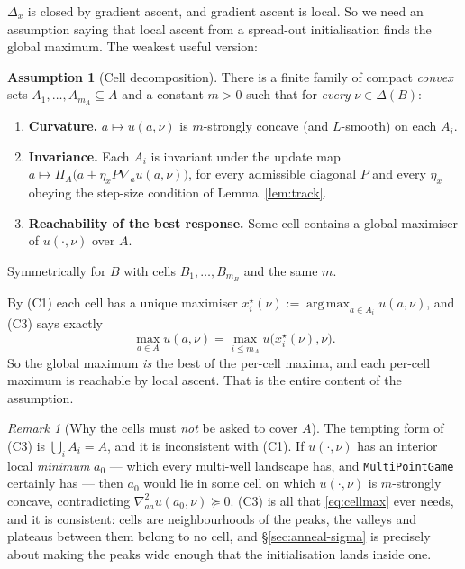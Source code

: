 \documentclass[11pt,a4paper]{article}
\theoremstyle{plain}
\theoremstyle{definition}
\newtheorem{assumption}{Assumption}
\theoremstyle{remark}
\newtheorem{remark}[theorem]{Remark}
\DeclareMathOperator*{\argmax}{arg\,max}
\newcommand{\simplex}{\Delta}
\begin{document}
$\Delta_x$ is closed by gradient ascent, and gradient ascent is local. So we need
an assumption saying that local ascent from a spread-out initialisation finds the
global maximum. The weakest useful version:

\begin{assumption}[Cell decomposition]\label{as:cells}
There is a finite family of compact \emph{convex} sets $A_1,\dots,A_{m_A}\subseteq A$
and a constant $m>0$ such that for \emph{every} $\nu\in\simplex(B)$:
\begin{enumerate}[label=(C\arabic*),leftmargin=*]
\item \textbf{Curvature.} $a\mapsto u(a,\nu)$ is $m$-strongly concave (and $L$-smooth)
on each $A_i$.
\item \textbf{Invariance.} Each $A_i$ is invariant under the update map
$a\mapsto\Pi_A\big(a+\eta_x P\nabla_a u(a,\nu)\big)$, for every admissible diagonal
$P$ and every $\eta_x$ obeying the step-size condition of Lemma~\ref{lem:track}.
\item \textbf{Reachability of the best response.} Some cell contains a global
maximiser of $u(\cdot,\nu)$ over $A$.
\end{enumerate}
Symmetrically for $B$ with cells $B_1,\dots,B_{m_B}$ and the same $m$.
\end{assumption}

By (C1) each cell has a unique maximiser
$x_i^\star(\nu) := \argmax_{a\in A_i} u(a,\nu)$, and (C3) says exactly
\begin{equation}\label{eq:cellmax}
\max_{a\in A} u(a,\nu) = \max_{i\le m_A} u\big(x_i^\star(\nu),\nu\big).
\end{equation}
So the global maximum \emph{is} the best of the per-cell maxima, and each per-cell
maximum is reachable by local ascent. That is the entire content of the assumption.

\begin{remark}[Why the cells must \emph{not} be asked to cover $A$]\label{rem:nocover}
The tempting form of (C3) is $\bigcup_iA_i=A$, and it is inconsistent with (C1).
If $u(\cdot,\nu)$ has an interior local \emph{minimum} $a_0$ --- which every
multi-well landscape has, and \texttt{MultiPointGame} certainly has --- then $a_0$
would lie in some cell on which $u(\cdot,\nu)$ is $m$-strongly concave, contradicting
$\nabla^2_{aa}u(a_0,\nu)\succeq0$. (C3) is all that \eqref{eq:cellmax} ever needs, and
it is consistent: cells are neighbourhoods of the peaks, the valleys and plateaus
between them belong to no cell, and \S\ref{sec:anneal-sigma} is precisely about making
the peaks wide enough that the initialisation lands inside one.
\end{remark}
\end{document}
